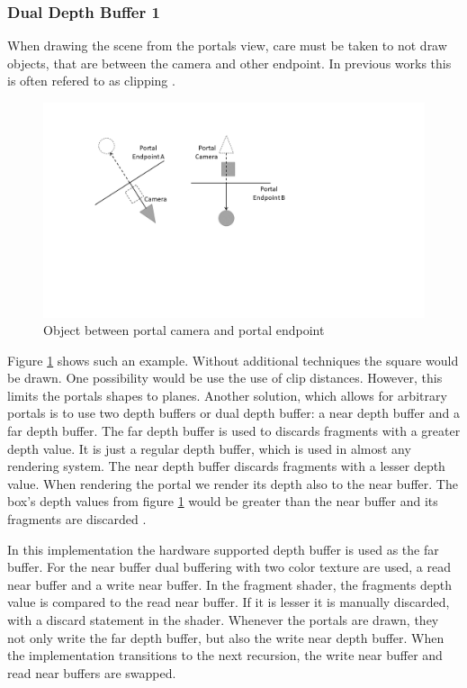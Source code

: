 \subsubsection{Dual Depth Buffer 1}

When drawing the scene from the portals view, care must be taken to not draw objects, that are between the camera and other endpoint. In previous works this is often refered to as clipping \cite{lowe:2005:technique}.
\begin{figure}[h]
	\includegraphics[width=\linewidth]{images/bananajuce.png}
	\caption{Object between portal camera and portal endpoint}
	\label{fig:bananajuce}
\end{figure}

Figure \ref{fig:bananajuce} shows such an example. Without additional techniques the square would be drawn. One possibility would be use the use of clip distances. However, this limits the portals shapes to planes. Another solution, which allows for arbitrary portals is to use two depth buffers or dual depth buffer: a near depth buffer and a far depth buffer. The far depth buffer is used to discards fragments with a greater depth value. It is just a regular depth buffer, which is used in almost any rendering system. The near depth buffer discards fragments with a lesser depth value. When rendering the portal we render its depth also to the near buffer. The box's depth values from figure \ref{fig:bananajuce} would be greater than the near buffer and its fragments are discarded \cite{lowe:2005:technique, ropinski:2004:real}.

In this implementation the hardware supported depth buffer is used as the far buffer. For the near buffer dual buffering with two color texture are used, a read near buffer and a write near buffer. In the fragment shader, the fragments depth value is compared to the read near buffer. If it is lesser it is manually discarded, with a discard statement in the shader. Whenever the portals are drawn, they not only write the far depth buffer, but also the write near depth buffer. When the implementation transitions to the next recursion, the write near buffer and read near buffers are swapped.

